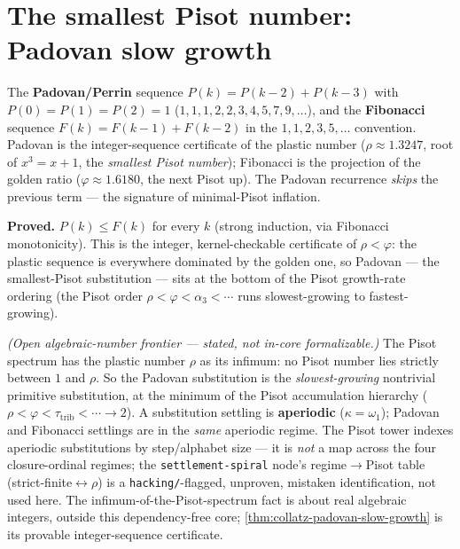 \section{The smallest Pisot number: Padovan slow growth}

\begin{proposition}
  \label{thm:collatz-padovan}
  \leanok
  The \textbf{Padovan/Perrin} sequence $P(k)=P(k-2)+P(k-3)$ with $P(0)=P(1)=P(2)=1$
  ($1,1,1,2,2,3,4,5,7,9,\dots$), and the \textbf{Fibonacci} sequence $F(k)=F(k-1)+F(k-2)$ in the
  $1,1,2,3,5,\dots$ convention. Padovan is the integer-sequence certificate of the plastic number
  ($\rho\approx1.3247$, root of $x^3=x+1$, the \emph{smallest Pisot number}); Fibonacci is the
  projection of the golden ratio ($\varphi\approx1.6180$, the next Pisot up). The Padovan recurrence
  \emph{skips} the previous term --- the signature of minimal-Pisot inflation.
\end{proposition}
\begin{theorem}
  \label{thm:collatz-padovan-slow-growth}
  \leanok
  \textbf{Proved.} $P(k)\le F(k)$ for every $k$ (strong induction, via Fibonacci monotonicity).
  This is the integer, kernel-checkable certificate of $\rho<\varphi$: the plastic sequence is everywhere
  dominated by the golden one, so Padovan --- the smallest-Pisot substitution --- sits at the bottom
  of the Pisot growth-rate ordering (the Pisot
  order $\rho<\varphi<\alpha_3<\cdots$ runs slowest-growing to fastest-growing).
\end{theorem}
\begin{theorem}
  \label{thm:collatz-settlement-spiral-extremal}
  \notready
  \emph{(Open algebraic-number frontier --- stated, not in-core formalizable.)} The Pisot spectrum has the plastic
  number $\rho$ as its infimum: no Pisot number lies strictly between $1$ and $\rho$. So the Padovan
  substitution is the \emph{slowest-growing} nontrivial primitive substitution, at the minimum of
  the Pisot accumulation hierarchy ($\rho<\varphi<\tau_{\mathrm{trib}}<\cdots\to2$). A substitution
  settling is \textbf{aperiodic} ($\kappa=\omega_1$); Padovan and Fibonacci settlings are in the
  \emph{same} aperiodic regime.
  The Pisot tower indexes aperiodic substitutions by step/alphabet size --- it is \emph{not} a map
  across the four closure-ordinal regimes; the \texttt{settlement-spiral} node's regime$\to$Pisot
  table (strict-finite$\leftrightarrow\rho$) is a \texttt{hacking/}-flagged, unproven, mistaken
  identification, not used here. The infimum-of-the-Pisot-spectrum fact is about real algebraic
  integers, outside this dependency-free core; \cref{thm:collatz-padovan-slow-growth} is its
  provable integer-sequence certificate.
\end{theorem}
